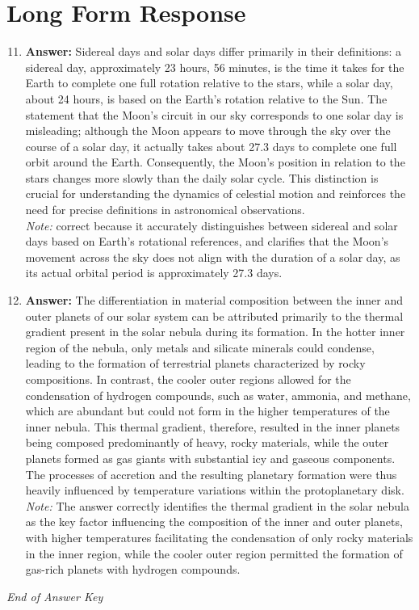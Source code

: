 \documentclass[12pt]{article}
\begin{document}
\section*{Long Form Response}
\begin{enumerate}[label=\arabic*.]
\setcounter{enumi}{10}
\item \textbf{Answer:} Sidereal days and solar days differ primarily in their definitions: a sidereal day, approximately 23 hours, 56 minutes, is the time it takes for the Earth to complete one full rotation relative to the stars, while a solar day, about 24 hours, is based on the Earth's rotation relative to the Sun. The statement that the Moon's circuit in our sky corresponds to one solar day is misleading; although the Moon appears to move through the sky over the course of a solar day, it actually takes about 27.3 days to complete one full orbit around the Earth. Consequently, the Moon's position in relation to the stars changes more slowly than the daily solar cycle. This distinction is crucial for understanding the dynamics of celestial motion and reinforces the need for precise definitions in astronomical observations.
\\ \textit{Note:} correct because it accurately distinguishes between sidereal and solar days based on Earth's rotational references, and clarifies that the Moon's movement across the sky does not align with the duration of a solar day, as its actual orbital period is approximately 27.3 days.
\item \textbf{Answer:} The differentiation in material composition between the inner and outer planets of our solar system can be attributed primarily to the thermal gradient present in the solar nebula during its formation. In the hotter inner region of the nebula, only metals and silicate minerals could condense, leading to the formation of terrestrial planets characterized by rocky compositions. In contrast, the cooler outer regions allowed for the condensation of hydrogen compounds, such as water, ammonia, and methane, which are abundant but could not form in the higher temperatures of the inner nebula. This thermal gradient, therefore, resulted in the inner planets being composed predominantly of heavy, rocky materials, while the outer planets formed as gas giants with substantial icy and gaseous components. The processes of accretion and the resulting planetary formation were thus heavily influenced by temperature variations within the protoplanetary disk.
\\ \textit{Note:} The answer correctly identifies the thermal gradient in the solar nebula as the key factor influencing the composition of the inner and outer planets, with higher temperatures facilitating the condensation of only rocky materials in the inner region, while the cooler outer region permitted the formation of gas-rich planets with hydrogen compounds.
\end{enumerate}

\vfill
\noindent\textit{End of Answer Key}
\end{document}
